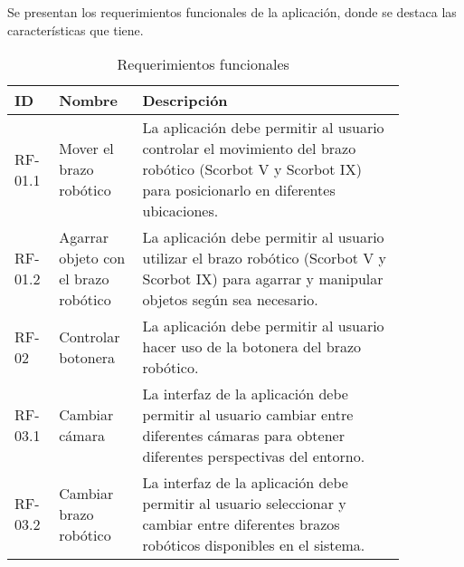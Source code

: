 Se presentan los requerimientos funcionales de la aplicación, donde se destaca las características que tiene.

\begin{table}[h!]
\centering
\begin{tabular}{ |>{\raggedright\arraybackslash}m{0.09\linewidth} |>{\raggedright\arraybackslash}m{0.17\linewidth} |>{\raggedright\arraybackslash}m{0.6\linewidth} | }
\hline
ID & Nombre & Descripción \\
\hline
RF-01.1 & Mover el brazo robótico & La aplicación debe permitir al usuario controlar el movimiento del brazo robótico (Scorbot V y Scorbot IX) para posicionarlo en diferentes ubicaciones. \\
\hline
RF-01.2 & Agarrar objeto con el brazo robótico & La aplicación debe permitir al usuario utilizar el brazo robótico (Scorbot V y Scorbot IX) para agarrar y manipular objetos según sea necesario. \\
\hline
RF-02 & Controlar botonera & La aplicación debe permitir al usuario hacer uso de la botonera del brazo robótico. \\
\hline
RF-03.1 & Cambiar cámara & La interfaz de la aplicación debe permitir al usuario cambiar entre diferentes cámaras para obtener diferentes perspectivas del entorno. \\
\hline
RF-03.2 & Cambiar brazo robótico & La interfaz de la aplicación debe permitir al usuario seleccionar y cambiar entre diferentes brazos robóticos disponibles en el sistema. \\
\hline
\end{tabular}
\caption{Requerimientos funcionales}
\end{table}